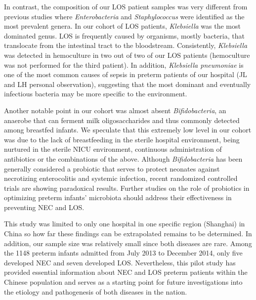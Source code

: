 \documentclass[fleqn,10pt]{wlpeerj} %
\begin{document}
In contrast, the composition of our LOS patient samples was very different from previous studies where \textit{Enterobacteria} and \textit{Staphylococcus}  were identified as the most prevalent genera\citep{Stewart2017Longitudinal, mai2013distortions}. In our cohort of LOS patients, \textit{Klebsiella} was the most dominated genus.  LOS is frequently caused by organisms, mostly bacteria, that translocate from the intestinal tract to the bloodstream.  Consistently, \textit{Klebsiella} was detected in hemoculture in two out of two of our LOS patients (hemoculture was not performed for the third patient). In addition, \textit{Klebsiella pneumoniae} is one of the most common causes of sepsis in preterm patients of our hospital (JL and LH personal observation), suggesting that the most dominant and eventually infectious bacteria may be more specific to the environment.

Another notable point in our cohort was almost absent \textit{Bifidobacteria}, an anaerobe that can ferment milk oligosaccharides\citep{gomez2016human} and thus commonly detected among breastfed infants\citep{murphy2017composition}. We speculate that this extremely low level in our cohort was due to the lack of breastfeeding in the sterile hospital environment, being nurtured in the sterile NICU environment, continuous administration of antibiotics or the combinations of the above. Although \textit{Bifidobacteria} has been generally considered a probiotic that serves to protect neonates against necrotizing enterocolitis and systemic infection\citep{nakayama2003intestinal, khodayar2014impact, hermansson2019breast}, recent randomized controlled trials are showing paradoxical results\citep{hays2016probiotics, singh2019probiotics}. Further studies on the role of probiotics in optimizing preterm infants’ microbiota should address their effectiveness in preventing NEC and LOS.

This study was limited to only one hospital in one specific region (Shanghai)  in China so how far these findings can be extrapolated remains to be determined. In addition, our sample size was relatively small since both diseases are rare\citep{neu2011necrotizing, cohen2009early}. Among the 1148 preterm infants admitted from July 2013 to December 2014, only five developed NEC and seven developed LOS. Nevertheless, this pilot study has provided essential information about NEC and LOS preterm patients within the Chinese population and serves as a starting point for future investigations into the etiology and pathogenesis of both diseases in the nation.
\end{document}
